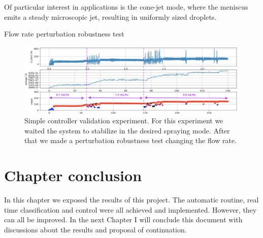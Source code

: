     Of particular interest in applications is the cone-jet mode, where the meniscus emits a steady microscopic jet, resulting in uniformly sized droplets. 

        Flow rate perturbation robustness test

        \begin{figure}[H]
            \center
            \includegraphics[width=17cm]{Figuras/19:03/control_first_results.png}
            \caption{Simple controller validation experiment. For this experiment we waited the system to stabilize in the desired spraying mode. After that we made a perturbation robustness test changing the flow rate.}
        \end{figure}


\section{Chapter conclusion}

In this chapter we exposed the results of this project. The automatic routine, real time classification and control were all achieved and implemented. However, they can all be improved. In the next Chapter I will conclude this document with discussions about the results and proposal of continuation.


\clearpage
